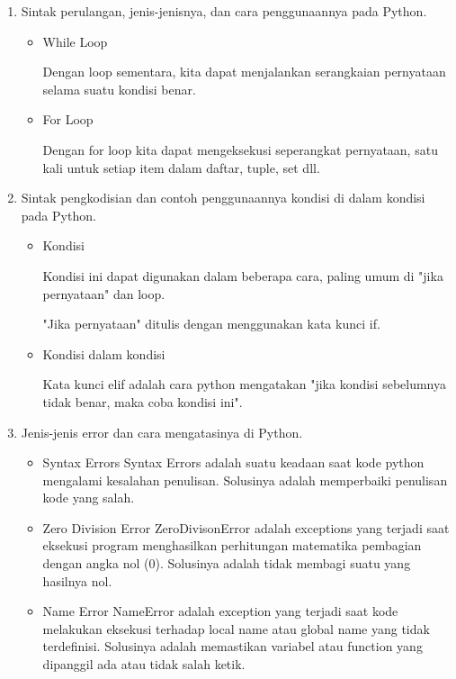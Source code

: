 \begin{enumerate}
\item Sintak perulangan, jenis-jenisnya, dan cara penggunaannya pada Python.
\begin{itemize}
\item While Loop
\par Dengan loop sementara, kita dapat menjalankan serangkaian pernyataan selama suatu kondisi benar.

\item For Loop
\par Dengan for loop kita dapat mengeksekusi seperangkat pernyataan, satu kali untuk setiap item dalam daftar, tuple, set dll.

\end{itemize}

\item Sintak pengkodisian dan contoh penggunaannya kondisi di dalam kondisi pada Python.
\begin{itemize}
\item Kondisi
\par Kondisi ini dapat digunakan dalam beberapa cara, paling umum di "jika pernyataan" dan loop.

"Jika pernyataan" ditulis dengan menggunakan kata kunci if.

\item Kondisi dalam kondisi
\par Kata kunci elif adalah cara python mengatakan "jika kondisi sebelumnya tidak benar, maka coba kondisi ini".

\end{itemize}


\item Jenis-jenis error dan cara mengatasinya di Python.
\begin{itemize}
\item Syntax Errors
Syntax Errors adalah suatu keadaan saat kode python mengalami kesalahan penulisan. Solusinya adalah memperbaiki penulisan kode yang salah.

\item Zero Division Error
ZeroDivisonError adalah exceptions yang terjadi saat eksekusi program menghasilkan perhitungan matematika pembagian dengan angka nol (0). Solusinya adalah tidak membagi suatu yang hasilnya nol.

\item Name Error
NameError adalah exception yang terjadi saat kode melakukan eksekusi terhadap local name atau global name yang tidak terdefinisi. Solusinya adalah memastikan variabel atau function yang dipanggil ada atau tidak salah ketik.


\end{itemize}
\end{enumerate}
